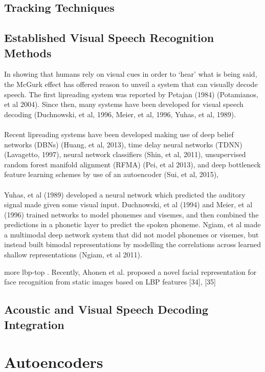 \documentclass[12pt,twoside]{report}
\begin{document}
		\subsection{Tracking Techniques}
		\subsection{Established Visual Speech Recognition Methods}
In showing that humans rely on visual cues in order to ‘hear’ what is being said, the McGurk effect has offered reason to unveil a system that can visually decode speech. The first lipreading system was reported by Petajan (1984) (Potamianos, et al 2004). Since then, many systems have been developed for visual speech decoding (Duchnowski, et al, 1996, Meier, et al, 1996, Yuhas, et al, 1989). 
\\ \\
Recent lipreading systems have been developed making use of deep belief networks (DBNs) (Huang, et al, 2013), time delay neural networks (TDNN) (Lavagetto, 1997), neural network classifiers (Shin, et al, 2011), unsupervised random forest manifold alignment (RFMA) (Pei, et al 2013), and deep bottleneck feature learning schemes by use of an autoencoder (Sui, et al, 2015), 
\\ \\
Yuhas, et al (1989) developed a neural network which predicted the auditory signal made given some visual input. Duchnowski, et al (1994) and Meier, et al (1996) trained networks to model phonemes and visemes, and then combined the predictions in a phonetic layer to predict the spoken phoneme. Ngiam, et al made a multimodal deep network system that did not model phonemes or visemes, but instead built bimodal representations by modelling the correlations across learned shallow representations (Ngiam, et al 2011).

more lbp-top
. Recently, Ahonen et al. proposed a novel facial representation for face recognition from static images based on LBP features [34], [35]
		\subsection{Acoustic and Visual Speech Decoding Integration}
	\section{Autoencoders}
\end{document}

